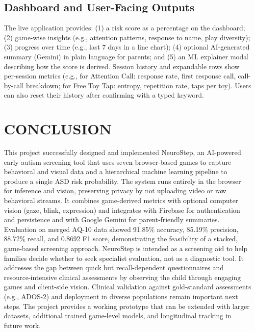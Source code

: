 \documentclass[12pt,a4paper]{report}
\begin{document}
\section{Dashboard and User-Facing Outputs}
The live application provides: (1) a risk score as a percentage on the dashboard; (2) game-wise insights (e.g., attention patterns, response to name, play diversity); (3) progress over time (e.g., last 7 days in a line chart); (4) optional AI-generated summary (Gemini) in plain language for parents; and (5) an ML explainer modal describing how the score is derived. Session history and expandable rows show per-session metrics (e.g., for Attention Call: response rate, first response call, call-by-call breakdown; for Free Toy Tap: entropy, repetition rate, taps per toy). Users can also reset their history after confirming with a typed keyword.
\chapter*{CONCLUSION}
This project successfully designed and implemented NeuroStep, an AI-powered early autism screening tool that uses seven browser-based games to capture behavioral and visual data and a hierarchical machine learning pipeline to produce a single ASD risk probability. The system runs entirely in the browser for inference and vision, preserving privacy by not uploading video or raw behavioral streams. It combines game-derived metrics with optional computer vision (gaze, blink, expression) and integrates with Firebase for authentication and persistence and with Google Gemini for parent-friendly summaries. Evaluation on merged AQ-10 data showed 91.85\% accuracy, 85.19\% precision, 88.72\% recall, and 0.8692 F1 score, demonstrating the feasibility of a stacked, game-based screening approach.
NeuroStep is intended as a screening aid to help families decide whether to seek specialist evaluation, not as a diagnostic tool. It addresses the gap between quick but recall-dependent questionnaires and resource-intensive clinical assessments by observing the child through engaging games and client-side vision. Clinical validation against gold-standard assessments (e.g., ADOS-2) and deployment in diverse populations remain important next steps. The project provides a working prototype that can be extended with larger datasets, additional trained game-level models, and longitudinal tracking in future work.
\end{document}
